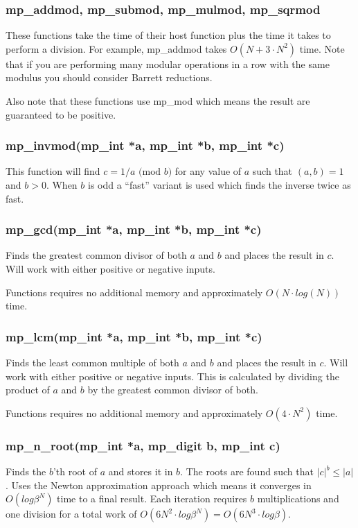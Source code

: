 \documentclass{article}
\begin{document}
\subsubsection{mp\_addmod, mp\_submod, mp\_mulmod, mp\_sqrmod}
These functions take the time of their host function plus the time it takes to perform a division.  For example, 
mp\_addmod takes $O(N + 3 \cdot N^2)$ time.  Note that if you are performing many modular operations in a row with
the same modulus you should consider Barrett reductions.  

Also note that these functions use mp\_mod which means the result are guaranteed to be positive.

\subsubsection{mp\_invmod(mp\_int *a, mp\_int *b, mp\_int *c)}
This function will find $c = 1/a \mbox{ (mod }b\mbox{)}$ for any value of $a$ such that $(a, b) = 1$ and $b > 0$.  When
$b$ is odd a ``fast'' variant is used which finds the inverse twice as fast.  

\subsubsection{mp\_gcd(mp\_int *a, mp\_int *b, mp\_int *c)}
Finds the greatest common divisor of both $a$ and $b$ and places the result in $c$.  Will work with either positive
or negative inputs.  

Functions requires no additional memory and approximately $O(N \cdot log(N))$ time.

\subsubsection{mp\_lcm(mp\_int *a, mp\_int *b, mp\_int *c)}
Finds the least common multiple of both $a$ and $b$ and places the result in $c$.  Will work with either positive
or negative inputs.  This is calculated by dividing the product of $a$ and $b$ by the greatest common divisor of 
both.  

Functions requires no additional memory and approximately $O(4 \cdot N^2)$ time.

\subsubsection{mp\_n\_root(mp\_int *a, mp\_digit b, mp\_int c)}
Finds the $b$'th root of $a$ and stores it in $b$.  The roots are found such that $\vert c \vert^b \le \vert a \vert$.  
Uses the Newton approximation approach which means it converges in $O(log \beta^N)$ time to a final result.  Each iteration
requires $b$ multiplications and one division for a total work of $O(6N^2 \cdot log \beta^N) = O(6N^3 \cdot log \beta)$.
\end{document}
